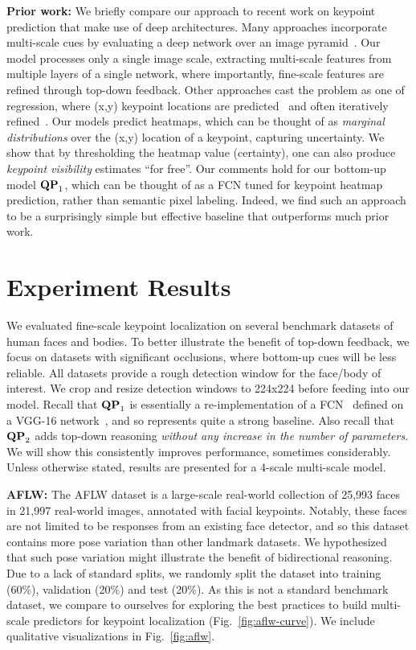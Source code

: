 \documentclass[10pt,twocolumn,letterpaper]{article}
\newcommand{\QP}[1]{{${\bf QP}_{#1}$}}
\begin{document}
{\bf Prior work:} We briefly compare our approach to recent work on
keypoint prediction that make use of deep architectures.  Many
approaches incorporate multi-scale cues by evaluating a deep network
over an image pyramid~\cite{tulsiani2014viewpoints,
  tompson2014efficient, tompson2014joint}. Our model processes only a
single image scale, extracting multi-scale features from multiple
layers of a single network, where importantly, fine-scale features are
refined through top-down feedback. Other approaches cast the problem
as one of regression, where (x,y) keypoint locations are
predicted~\cite{zhang2014facial} and often iteratively
refined~\cite{carreira2015human,sun2013deep}. Our models predict
heatmaps, which can be thought of as {\em marginal distributions} over
the (x,y) location of a keypoint, capturing uncertainty. We show that
by thresholding the heatmap value (certainty), one can also produce
{\em keypoint visibility} estimates ``for free''. Our comments hold
for our bottom-up model \QP{1}, which can be thought of as a FCN tuned
for keypoint heatmap prediction, rather than semantic pixel
labeling. Indeed, we find such an approach to be a surprisingly simple
but effective baseline that outperforms much prior work.

\section{Experiment Results}

We evaluated fine-scale keypoint localization on several benchmark
datasets of human faces and bodies. To better illustrate the benefit
of top-down feedback, we focus on datasets with significant
occlusions, where bottom-up cues will be less reliable. All datasets
provide a rough detection window for the face/body of interest. We
crop and resize detection windows to 224x224 before feeding into our
model. Recall that \QP{1} is essentially a re-implementation of a
FCN~\cite{long2014fully} defined on a VGG-16
network~\cite{simonyan2014very}, and so represents quite a strong
baseline.  Also recall that \QP{2} adds top-down reasoning {\em
  without any increase in the number of parameters}. We will show this
consistently improves performance, sometimes considerably.  Unless
otherwise stated, results are presented for a 4-scale multi-scale
model. 


{\bf AFLW:} The AFLW dataset \cite{kostinger2011annotated} is a
large-scale real-world collection of 25,993 faces in 21,997 real-world
images, annotated with facial keypoints. Notably, these faces are not
limited to be responses from an existing face detector, and so this
dataset contains more pose variation than other landmark datasets. We
hypothesized that such pose variation might illustrate the benefit of
bidirectional reasoning. Due to a lack of standard splits, we randomly
split the dataset into training (60\%), validation (20\%) and test
(20\%). As this is not a standard benchmark dataset, we compare to ourselves
for exploring the best practices to build multi-scale predictors for
keypoint localization (Fig.~\ref{fig:aflw-curve}). We include qualitative visualizations in Fig.~\ref{fig:aflw}.
\end{document}
